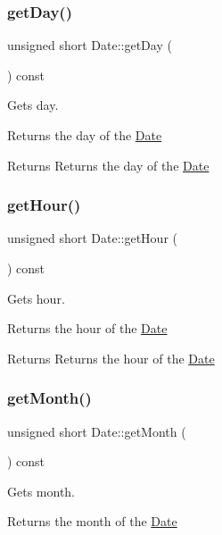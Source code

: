 \subsubsection{\texorpdfstring{get\+Day()}{getDay()}}
{\footnotesize\ttfamily unsigned short Date\+::get\+Day (\begin{DoxyParamCaption}{ }\end{DoxyParamCaption}) const}



Gets day. 

Returns the day of the \hyperlink{class_date}{Date}

\begin{DoxyReturn}{Returns}
Returns the day of the \hyperlink{class_date}{Date} 
\end{DoxyReturn}
\mbox{\label{class_date_a49673a3830aada7b4b55616b5848c843}} 
\subsubsection{\texorpdfstring{get\+Hour()}{getHour()}}
{\footnotesize\ttfamily unsigned short Date\+::get\+Hour (\begin{DoxyParamCaption}{ }\end{DoxyParamCaption}) const}



Gets hour. 

Returns the hour of the \hyperlink{class_date}{Date}

\begin{DoxyReturn}{Returns}
Returns the hour of the \hyperlink{class_date}{Date} 
\end{DoxyReturn}
\mbox{\label{class_date_ad077bd6ae19462875a8bd10aed9a6233}} 
\subsubsection{\texorpdfstring{get\+Month()}{getMonth()}}
{\footnotesize\ttfamily unsigned short Date\+::get\+Month (\begin{DoxyParamCaption}{ }\end{DoxyParamCaption}) const}



Gets month. 

Returns the month of the \hyperlink{class_date}{Date}

